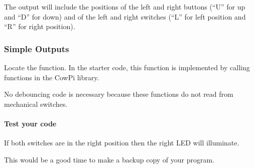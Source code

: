 \begin{description}
\end{description}
The output will include the positions of the left and right buttons (``U'' for up and ``D'' for down) and of the left and right switches (``L'' for left position and ``R'' for right position).


\subsubsection{Simple Outputs}

Locate the  function.
In the starter code, this function is implemented by calling functions in the CowPi library.

\begin{description}
    \begin{description}
        \item[\phantom{xxx}$\bullet$] No debouncing code is necessary because these functions do not read from mechanical switches.
    \end{description}
\end{description}

\paragraph{Test your code}

\begin{description}
\end{description}
If both switches are in the right position then the right LED will illuminate.

\vspace{1cm}

This would be a good time to make a backup copy of your program.


